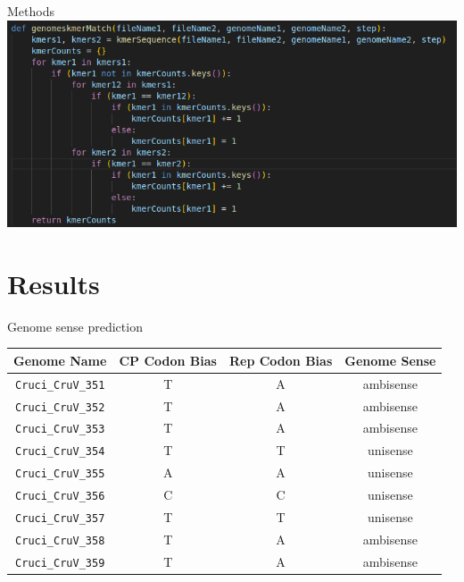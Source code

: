 \documentclass{beamer}
\begin{document}
\begin{frame}{Methods}
    \centering
    \includegraphics[scale = 0.5]{code.png}
\end{frame}

\section{Results}

\begin{frame}{Genome sense prediction}
\begin{center}
\begin{tabular}{||c c c c||}
    \hline
    Genome Name & CP Codon Bias & Rep Codon Bias & Genome Sense \\ [0.5ex]
    \hline\hline
    \texttt{Cruci\_CruV\_351} & T & A & ambisense \\
    \hline
    \texttt{Cruci\_CruV\_352} & T & A & ambisense \\
    \hline
    \texttt{Cruci\_CruV\_353} & T & A & ambisense \\
    \hline
    \texttt{Cruci\_CruV\_354} & T & T & unisense \\
    \hline
    \texttt{Cruci\_CruV\_355} & A & A & unisense \\
    \hline
    \texttt{Cruci\_CruV\_356} & C & C & unisense \\
    \hline
    \texttt{Cruci\_CruV\_357} & T & T & unisense \\
    \hline
    \texttt{Cruci\_CruV\_358} & T & A & ambisense \\
    \hline
    \texttt{Cruci\_CruV\_359} & T & A & ambisense \\ [1ex]
    \hline
\end{tabular}
\end{center}
\end{frame}
\end{document}
